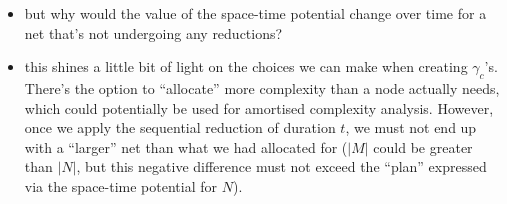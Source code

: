 \documentclass{fit-teorsem}
\begin{document}
\begin{itemize}
		\begin{itemize}
			\item but why would the value of the space-time potential change over time for a net that's not
				undergoing any reductions?
			\item this shines a little bit of light on the choices we can make when creating $\gamma_c$'s.
				There's the option to ``allocate'' more complexity than a node actually needs,
				which could potentially be used for amortised complexity analysis. However, once
				we apply the sequential reduction of duration $t$, we must not end up with a ``larger''
				net than what we had allocated for ($|M|$ could be greater than $|N|$, but this negative
				difference must not exceed the ``plan'' expressed via the space-time potential for $N$).
		\end{itemize}


\end{itemize}
\end{document}
